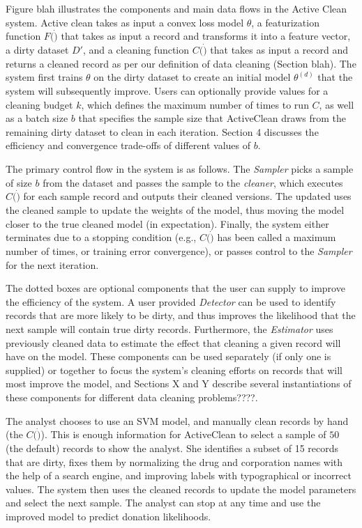Figure blah illustrates the components and main data flows in the Active Clean system.
Active clean takes as input a convex loss model $\theta$, a featurization function $F(\dot)$ that takes as input a record and 
transforms it into a feature vector, a dirty dataset $D'$, and a cleaning function $C(\dot)$ that takes as input a record and returns a cleaned record as per our 
definition of data cleaning (Section blah).
The system first trains $\theta$ on the dirty dataset to  create an initial model $\theta^(d)$ that the system will subsequently improve.
Users can optionally provide values for a cleaning budget $k$, which defines the maximum number of times to run $C$, as well as
a batch size $b$ that specifies the sample size that ActiveClean draws from the remaining dirty dataset to clean in each iteration.  
Section 4 discusses the efficiency and convergence trade-offs of different values of $b$.

The primary control flow in the system is as follows.  The {\it Sampler} picks a sample of size $b$ from the dataset and passes
the sample to the {\it cleaner}, which executes $C(\dot)$ for each sample record and outputs their cleaned versions.
The updated uses the cleaned sample to update the weights of the model, thus moving the model closer to the true cleaned model (in expectation).
Finally, the system either terminates due to a stopping condition (e.g., $C(\dot)$ has been called a maximum number of times, or training error convergence),
or passes control to the {\it Sampler} for the next iteration.

The dotted boxes are optional components that the user can supply to improve the efficiency of the system.  
A user provided {\it Detector} can be used to identify records that are more likely to be dirty, and  thus 
improves the likelihood that the next sample will contain true dirty records.
Furthermore, the {\it Estimator} uses previously cleaned data to estimate the effect that cleaning a given record will have on the model.
These components can be used separately (if only one is supplied) or together to focus the system's cleaning efforts on records that will most improve the model,
and Sections X and Y describe several instantiations of these components for different data cleaning problems????.

\begin{example}\label{archex1}
The analyst chooses to use an SVM model, and manually clean records by hand (the $C(\dot)$).  
This is enough information for ActiveClean to select a sample of $50$ (the default) records to show the analyst.
She identifies a subset of 15 records that are dirty, fixes them by normalizing the drug and corporation names with the help of a search engine, and improving labels with typographical or incorrect values.
The system then uses the cleaned records to update the model parameters and select the next sample.
The analyst can stop at any time and use the improved model to predict donation likelihoods.
\end{example}


